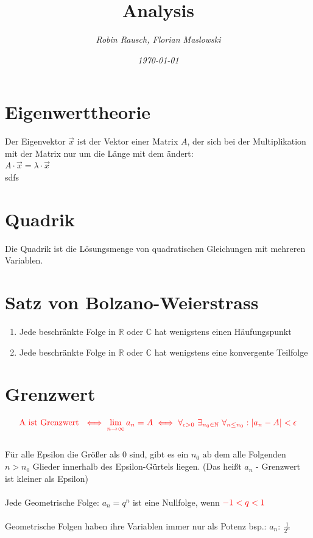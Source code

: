 \documentclass[12pt,a4paper]{article}
\author{\slshape Robin Rausch, Florian Maslowski}
\title{Analysis}
\date{\slshape \today}
\begin{document}
\maketitle
\tableofcontents
\newpage
\section{Eigenwerttheorie}
	Der Eigenvektor $\overrightarrow{x} $ ist der Vektor einer Matrix $A$, der sich bei der Multiplikation mit der Matrix
	nur um die Länge mit dem ändert:\\
	\Large $A \cdot \overrightarrow{x} = \lambda \cdot \overrightarrow{x} $\\
	\normalsize sdfs


\section{Quadrik}   
    Die Quadrik ist die Lösungsmenge von quadratischen Gleichungen mit mehreren Variablen.
	
\section{Satz von Bolzano-Weierstrass}
	\begin{enumerate}
		\item Jede beschränkte Folge in $\mathbb{R}$ oder $\mathbb{C}$ hat wenigstens einen Häufungspunkt
  		\item Jede beschränkte Folge in $\mathbb{R}$ oder $\mathbb{C}$ hat wenigstens eine konvergente Teilfolge
	\end{enumerate}


\section{Grenzwert}
	$$\color{red}\text{A ist Grenzwert } \iff \lim_{n\rightarrow\infty}{a_{n}=A} \iff\forall_{\epsilon>0}~\exists_{n_{0}\in\mathbb{N}} ~\forall_{n \leq n_{0}}: | a     		_{n}-A | < \epsilon$$\\
	Für alle Epsilon die Größer als 0 sind, gibt es ein $n_{0}$ $\underline{\text{ab dem}}$ alle Folgenden $n>n_{0}$ Glieder innerhalb des Epsilon-Gürtels liegen. (Das 		heißt $a_{n}$ - Grenzwert ist kleiner 	als Epsilon)\\\\
	Jede Geometrische Folge: $a_{n}=q^{n}$ ist eine Nullfolge, wenn $\color{red}-1<q<1$\\\\
	Geometrische Folgen haben ihre Variablen immer nur als Potenz bsp.: $a_{n}:~\frac{1}{2^{n}}$
	
\end{document}

